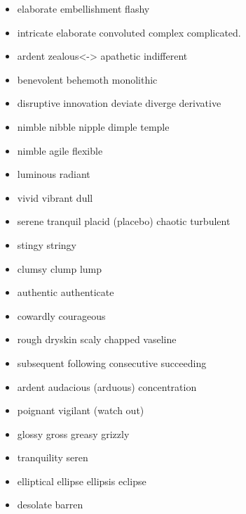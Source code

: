 \documentclass[a4paper,11pt,twoside]{book}
\begin{document}
\begin{itemize}
	\item elaborate embellishment flashy 
	
	\item intricate elaborate convoluted complex complicated.

	\item ardent zealous<-> apathetic indifferent
	
	\item benevolent behemoth monolithic 
	
	\item disruptive innovation deviate diverge derivative
	
	\item nimble nibble nipple dimple temple
	
	\item nimble agile flexible
	
	\item luminous radiant

	\item vivid vibrant dull

	\item serene tranquil placid (placebo) chaotic turbulent

	\item stingy stringy 

	\item clumsy clump lump

	\item authentic authenticate  
	
	\item cowardly courageous
	
	\item rough dryskin scaly chapped vaseline 

	\item subsequent following consecutive succeeding
	
	\item ardent audacious (arduous) concentration 

	\item poignant vigilant (watch out)

	\item glossy gross greasy grizzly 
	
	\item tranquility seren
	
	\item elliptical ellipse ellipsis eclipse

	\item desolate barren 
	

\end{itemize}
\end{document}
